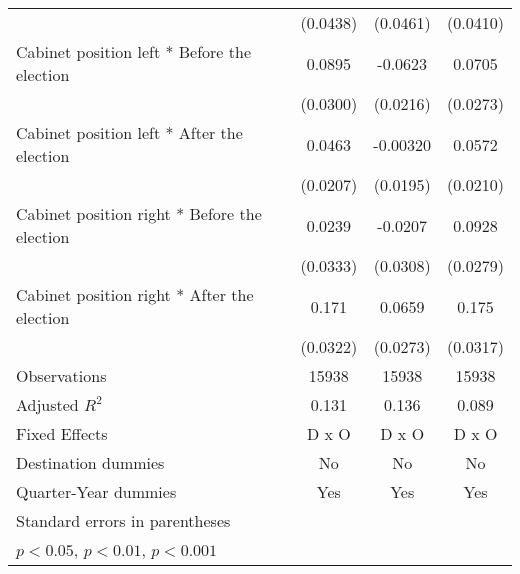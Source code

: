 \begin{table}[htbp]
\begin{tabular}{l*{3}{c}}
                    &    (0.0438)         &    (0.0461)         &    (0.0410)         \\
[1em]
Cabinet position left * Before the election&      0.0895\sym{**} &     -0.0623\sym{**} &      0.0705\sym{*}  \\
                    &    (0.0300)         &    (0.0216)         &    (0.0273)         \\
[1em]
Cabinet position left * After the election&      0.0463\sym{*}  &    -0.00320         &      0.0572\sym{**} \\
                    &    (0.0207)         &    (0.0195)         &    (0.0210)         \\
[1em]
Cabinet position right * Before the election&      0.0239         &     -0.0207         &      0.0928\sym{**} \\
                    &    (0.0333)         &    (0.0308)         &    (0.0279)         \\
[1em]
Cabinet position right * After the election&       0.171\sym{***}&      0.0659\sym{*}  &       0.175\sym{***}\\
                    &    (0.0322)         &    (0.0273)         &    (0.0317)         \\
\hline
Observations        &       15938         &       15938         &       15938         \\
Adjusted \(R^{2}\)  &       0.131         &       0.136         &       0.089         \\
Fixed Effects       &       D x O         &       D x O         &       D x O         \\
Destination dummies &          No         &          No         &          No         \\
Quarter-Year dummies&         Yes         &         Yes         &         Yes         \\
\hline\hline
\multicolumn{4}{l}{\footnotesize Standard errors in parentheses}\\
\multicolumn{4}{l}{\footnotesize \sym{*} \(p<0.05\), \sym{**} \(p<0.01\), \sym{***} \(p<0.001\)}\\
\end{tabular}
\end{table}
